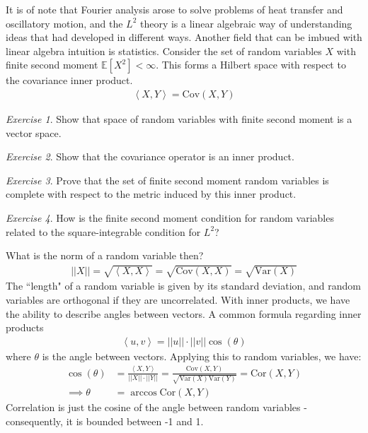 \documentclass[11pt]{article}
\newcommand{\EV}{\ensuremath{\mathbb E}}
\newcommand{\Var}{\text{Var}}
\newcommand{\Cov}{\text{Cov}}
\newcommand{\ip}[2]{\left\langle #1, #2\right\rangle}
\theoremstyle{plain}
\theoremstyle{definition}
\theoremstyle{remark}
\newtheorem{exc}{Exercise}[section]
\begin{document}
It is of note that Fourier analysis arose to solve problems of heat transfer and oscillatory motion, and the $L^2$ theory is a linear algebraic way of understanding ideas that had developed in different ways. Another field that can be imbued with linear algebra intuition is statistics. Consider the set of random variables $X$ with finite second moment $\EV[X^2] < \infty$. This forms a Hilbert space with respect to the covariance inner product.
\begin{align*}
    \ip{X}{Y} = \Cov(X,Y)
\end{align*}
\begin{exc}
    Show that space of random variables with finite second moment is a vector space.
\end{exc}
\begin{exc}
    Show that the covariance operator is an inner product.
\end{exc}
\begin{exc}
    Prove that the set of finite second moment random variables is complete with respect to the metric induced by this inner product.
\end{exc}
\begin{exc}
    How is the finite second moment condition for random variables related to the square-integrable condition for $L^2$?
\end{exc}
What is the norm of a random variable then?
\begin{align*}
    ||X|| = \sqrt{\ip{X}{X}} = \sqrt{\Cov(X,X)} = \sqrt{\Var(X)}
\end{align*}
The ``length" of a random variable is given by its standard deviation, and random variables are orthogonal if they are uncorrelated. With inner products, we have the ability to describe angles between vectors. A common formula regarding inner products
\begin{align*}
    \ip{u}{v} = ||u|| \cdot ||v|| \cos(\theta)
\end{align*}
where $\theta$ is the angle between vectors. Applying this to random variables, we have:
\begin{align*}
    \cos(\theta) &= \frac{\ip{X}{Y}}{||X|| \cdot ||Y||} = \frac{\Cov(X,Y)}{\sqrt{\Var(X) \Var(Y)}} = \text{Cor}(X, Y)\\
    \implies \theta &= \arccos \text{Cor}(X, Y)
\end{align*}
Correlation is just the cosine of the angle between random variables - consequently, it is bounded between -1 and 1.
\end{document}
